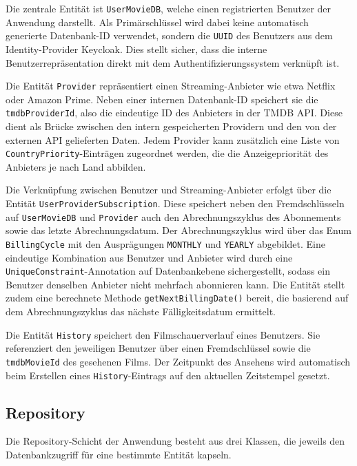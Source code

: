 Die zentrale Entität ist \texttt{UserMovieDB}, welche einen registrierten Benutzer
der Anwendung darstellt. Als Primärschlüssel wird dabei keine automatisch generierte
Datenbank-ID verwendet, sondern die \texttt{UUID} des Benutzers aus dem
Identity-Provider Keycloak. Dies stellt sicher, dass die interne
Benutzerrepräsentation direkt mit dem Authentifizierungssystem verknüpft ist.

Die Entität \texttt{Provider} repräsentiert einen Streaming-Anbieter wie etwa
Netflix oder Amazon Prime. Neben einer internen Datenbank-ID speichert sie die
\texttt{tmdbProviderId}, also die eindeutige ID des Anbieters in der TMDB API.
Diese dient als Brücke zwischen den intern gespeicherten Providern und den von
der externen API gelieferten Daten. Jedem Provider kann zusätzlich eine Liste
von \texttt{CountryPriority}-Einträgen zugeordnet werden, die die Anzeigepriorität
des Anbieters je nach Land abbilden.

Die Verknüpfung zwischen Benutzer und Streaming-Anbieter erfolgt über die
Entität \texttt{UserProviderSubscription}. Diese speichert neben den
Fremdschlüsseln auf \texttt{UserMovieDB} und \texttt{Provider} auch den
Abrechnungszyklus des Abonnements sowie das letzte Abrechnungsdatum. Der
Abrechnungszyklus wird über das Enum \texttt{BillingCycle} mit den
Ausprägungen \texttt{MONTHLY} und \texttt{YEARLY} abgebildet. Eine eindeutige
Kombination aus Benutzer und Anbieter wird durch eine
\texttt{UniqueConstraint}-Annotation auf Datenbankebene sichergestellt, sodass
ein Benutzer denselben Anbieter nicht mehrfach abonnieren kann. Die Entität
stellt zudem eine berechnete Methode \texttt{getNextBillingDate()} bereit, die
basierend auf dem Abrechnungszyklus das nächste Fälligkeitsdatum ermittelt.

Die Entität \texttt{History} speichert den Filmschauerverlauf eines Benutzers.
Sie referenziert den jeweiligen Benutzer über einen Fremdschlüssel sowie die
\texttt{tmdbMovieId} des gesehenen Films. Der Zeitpunkt des Ansehens wird
automatisch beim Erstellen eines \texttt{History}-Eintrags auf den aktuellen
Zeitstempel gesetzt.

\subsection{Repository}

Die Repository-Schicht der Anwendung besteht aus drei Klassen, die jeweils
den Datenbankzugriff für eine bestimmte Entität kapseln.

